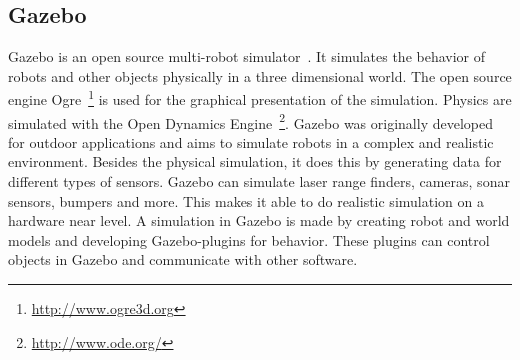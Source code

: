 \documentclass[11pt,a4paper,titlepage]{article}
\begin{document}
\subsection{Gazebo}
Gazebo is an open source multi-robot simulator~\cite{GazeboDesign}. It simulates the behavior of robots and other objects physically in a three dimensional world. The open source engine Ogre~\footnote{\url{http://www.ogre3d.org}} is used for the graphical presentation of the simulation. Physics are simulated with the Open Dynamics Engine~\footnote{\url{http://www.ode.org/}}. Gazebo was originally developed for outdoor applications and aims to simulate robots in a complex and realistic environment. Besides the physical simulation, it does this by generating data for different types of sensors. Gazebo can simulate laser range finders, cameras, sonar sensors, bumpers and more. This makes it able to do realistic simulation on a hardware near level. A simulation in Gazebo is made by creating robot and world models and developing Gazebo-plugins for behavior. These plugins can control objects in Gazebo and communicate with other software.
\end{document}
